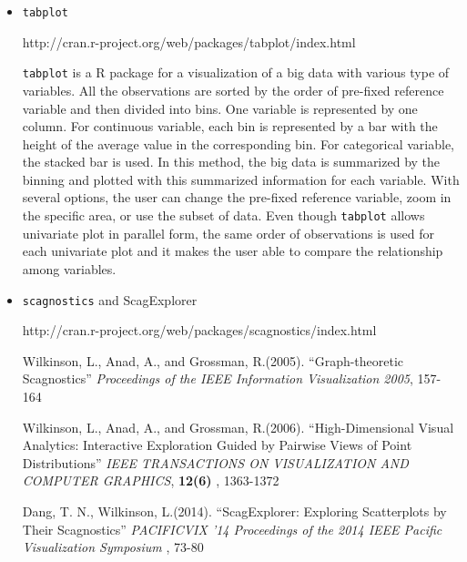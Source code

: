 \documentclass{article}
\begin{document}
\begin{itemize}
\item  {\tt tabplot}

http://cran.r-project.org/web/packages/tabplot/index.html

{\tt tabplot} is a R package for a visualization of a big data with various type of variables.
 All the observations are sorted by the order of pre-fixed reference variable and then divided into bins. One variable is represented by one column. For continuous variable, each bin is represented by a bar with the height of the average value in the corresponding bin. For categorical variable, the stacked bar is used.
 In this method, the big data is summarized by the binning and plotted with this summarized information for each variable. With several options, the user can change the pre-fixed reference variable,
 zoom in the specific area, or use the subset of data. Even though {\tt tabplot} allows univariate plot in parallel form, the same order of observations is used for each univariate plot and it makes the user able to compare the relationship among variables.

\item {\tt scagnostics} and ScagExplorer

http://cran.r-project.org/web/packages/scagnostics/index.html

Wilkinson, L., Anad, A., and Grossman, R.(2005).
``Graph-theoretic Scagnostics''
{\em Proceedings of the IEEE Information Visualization 2005}, 157-164

Wilkinson, L., Anad, A., and Grossman, R.(2006).
``High-Dimensional Visual Analytics: Interactive Exploration Guided by Pairwise Views of Point Distributions''
{\em IEEE TRANSACTIONS ON VISUALIZATION AND COMPUTER GRAPHICS}, {\bf 12(6)} , 1363-1372


Dang, T. N., Wilkinson, L.(2014).
``ScagExplorer: Exploring Scatterplots by Their Scagnostics''
{\em PACIFICVIX '14 Proceedings of the 2014 IEEE Pacific Visualization Symposium }, 73-80


\end{itemize}
\end{document}
